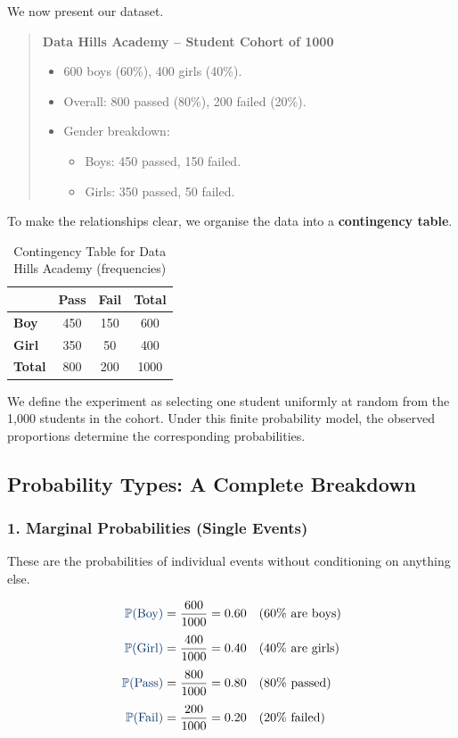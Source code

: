 \documentclass[12pt,a4paper,oneside]{report}
\theoremstyle{mytheorem}
\theoremstyle{mydefinition}
\theoremstyle{myremark}
\newcommand{\Prob}{\mathbb{P}}
\begin{document}
We now present our dataset.

\begin{quote}
\noindent\textbf{Data Hills Academy – Student Cohort of 1000}
\begin{itemize}
    \item 600 boys (60\%), 400 girls (40\%).
    \item Overall: 800 passed (80\%), 200 failed (20\%).
    \item Gender breakdown:
    \begin{itemize}
        \item Boys: 450 passed, 150 failed.
        \item Girls: 350 passed, 50 failed.
    \end{itemize}
\end{itemize}
\end{quote}

To make the relationships clear, we organise the data into a \textbf{contingency table}.

\begin{table}[h]
\centering
\caption{Contingency Table for Data Hills Academy (frequencies)}
\begin{tabular}{l|cc|c}
 & \textbf{Pass} & \textbf{Fail} & \textbf{Total} \\
\hline
\textbf{Boy} & 450 & 150 & 600 \\
\textbf{Girl} & 350 & 50 & 400 \\
\hline
\textbf{Total} & 800 & 200 & 1000
\end{tabular}
\end{table}

We define the experiment as selecting one student uniformly at random from the 1,000 students in the cohort. Under this finite probability model, the observed proportions determine the corresponding probabilities.

\subsection*{Probability Types: A Complete Breakdown}

\subsubsection*{1. Marginal Probabilities (Single Events)}
These are the probabilities of individual events without conditioning on anything else.

\[
\begin{aligned}
\color{myblue} \Prob(\text{Boy}) &= \frac{600}{1000} = 0.60 \quad\text{(60\% are boys)} \\[4pt]
\color{myblue} \Prob(\text{Girl}) &= \frac{400}{1000} = 0.40 \quad\text{(40\% are girls)} \\[4pt]
\color{myblue} \Prob(\text{Pass}) &= \frac{800}{1000} = 0.80 \quad\text{(80\% passed)} \\[4pt]
\color{myblue} \Prob(\text{Fail}) &= \frac{200}{1000} = 0.20 \quad\text{(20\% failed)}
\end{aligned}
\]
\end{document}
